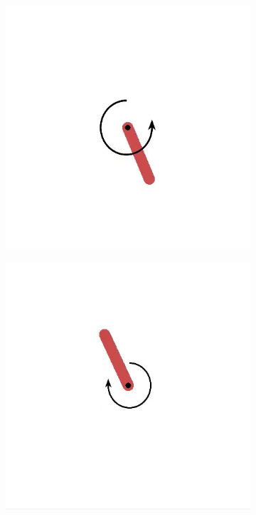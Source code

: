 \documentclass{article}
\begin{document}
\begin{figure}[!p]
\centering
  \begin{subfigure}{0.18\textwidth}
  \centering
  \includegraphics[width=\textwidth]{figures/pendulum/f1}
  \caption{}
  \end{subfigure}
  \begin{subfigure}{0.18\textwidth}
  \centering
  \includegraphics[width=\textwidth]{figures/pendulum/f2}

\end{subfigure}
\end{figure}
\end{document}
